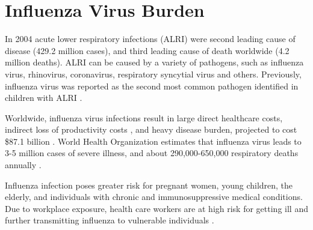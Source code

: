 \section{Influenza Virus Burden}

In 2004 acute lower respiratory infections (ALRI) were second leading cause of disease (429.2 million cases), and third leading cause of death worldwide \cite{world2008global} (4.2 million deaths). ALRI can be caused by a variety of pathogens, such as influenza virus, rhinovirus, coronavirus, respiratory syncytial virus and others. Previously, influenza virus was reported as the second most common pathogen identified in children with ALRI \cite{nair2011global}.

Worldwide, influenza virus infections result in large direct healthcare costs, indirect loss of productivity costs \cite{de2015systematic}, and heavy disease burden, projected to cost \$87.1 billion \cite{molinari2007annual}. World Health Organization estimates that influenza virus leads to 3-5 million cases of severe illness, and about 290,000-650,000 respiratory deaths annually \cite{influenza_seasonal_2018}.

Influenza infection poses greater risk for pregnant women, young children, the elderly, and individuals with chronic and immunosuppressive medical conditions. Due to workplace exposure, health care workers are at high risk for getting ill and further transmitting influenza to vulnerable individuals \cite{influenza_seasonal_2018}.